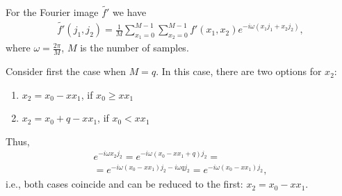 For the Fourier image $\tilde{f'}$ we have 
\begin{eqnarray}
\tilde{f'}\left(j_1, j_2\right) = 
\frac{1}{M}\sum_{x_1 = 0}^{M-1}\sum_{x_2 = 0}^{M-1} 
f'\left(x_1, x_2\right)e^{-i \omega\left(x_1 j_1 + x_2j_2\right)},
\label{eq:part4:quantcomp:discretlog:ftq16_pre}
\end{eqnarray}
where $\omega = \frac{2 \pi}{M}$, $M$ is the number of samples. 

Consider first the case when $M = q$. In this case, there are
two options for $x_2$:  
\begin{enumerate}
\item $x_2 = x_0 - x x_1$, if $x_0 \ge x x_1$
\item $x_2 = x_0 + q - x x_1$, if $x_0 < x x_1$
\end{enumerate}
Thus,
\begin{eqnarray}
e^{-i \omega x_2 j_2} = e^{-i \omega\left(x_0 - x x_1 + q\right) j_2} = 
\nonumber \\
= e^{-i \omega\left(x_0 - x x_1\right) j_2 - i \omega q j_2} = 
e^{-i \omega\left(x_0 - x x_1\right) j_2},
\nonumber
\end{eqnarray}
i.e., both cases coincide and can be reduced to the first:
$x_2 = x_0 - x x_1$.

